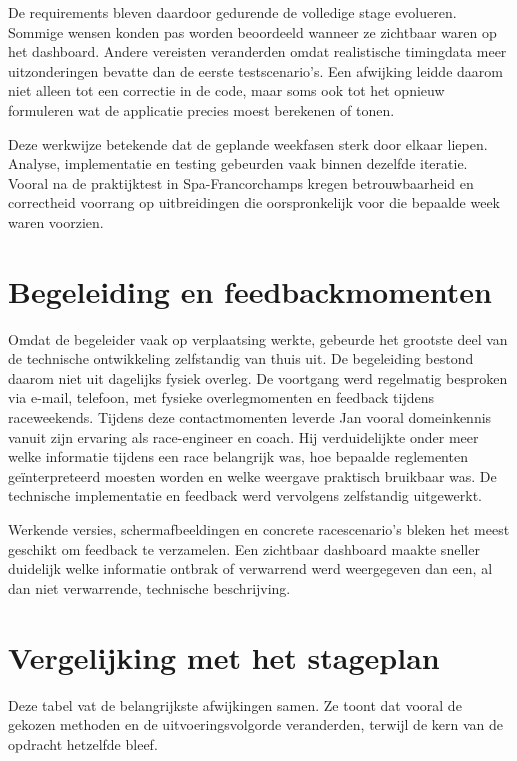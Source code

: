 De requirements bleven daardoor gedurende de volledige stage evolueren. Sommige wensen konden pas
worden beoordeeld wanneer ze zichtbaar waren op het dashboard. Andere vereisten veranderden omdat
realistische timingdata meer uitzonderingen bevatte dan de eerste testscenario's. Een afwijking
leidde daarom niet alleen tot een correctie in de code, maar soms ook tot het opnieuw
formuleren wat de applicatie precies moest berekenen of tonen.

Deze werkwijze betekende dat de geplande weekfasen sterk door elkaar liepen. Analyse, implementatie
en testing gebeurden vaak binnen dezelfde iteratie. Vooral na de praktijktest in
Spa-Francorchamps kregen betrouwbaarheid en correctheid voorrang op uitbreidingen die oorspronkelijk
voor die bepaalde week waren voorzien.

\section{Begeleiding en feedbackmomenten}

Omdat de begeleider vaak op verplaatsing werkte, gebeurde het grootste deel van de technische ontwikkeling zelfstandig van thuis uit. De begeleiding bestond daarom niet uit dagelijks fysiek overleg. De voortgang werd regelmatig besproken via e-mail, telefoon, met fysieke overlegmomenten en feedback tijdens raceweekends.
Tijdens deze contactmomenten leverde Jan vooral domeinkennis vanuit zijn ervaring als race-engineer en coach. Hij verduidelijkte onder meer welke informatie tijdens een race belangrijk was, hoe bepaalde reglementen geïnterpreteerd moesten worden en welke weergave praktisch bruikbaar was. De technische implementatie en feedback werd vervolgens zelfstandig uitgewerkt.

Werkende versies, schermafbeeldingen en concrete racescenario's bleken het meest geschikt om feedback te verzamelen. Een zichtbaar dashboard maakte sneller duidelijk welke informatie ontbrak of verwarrend werd weergegeven dan een, al dan niet verwarrende, technische beschrijving.

\section{Vergelijking met het stageplan}

Deze tabel vat de belangrijkste afwijkingen samen. Ze toont dat vooral de
gekozen methoden en de uitvoeringsvolgorde veranderden, terwijl de kern van de opdracht hetzelfde
bleef.

